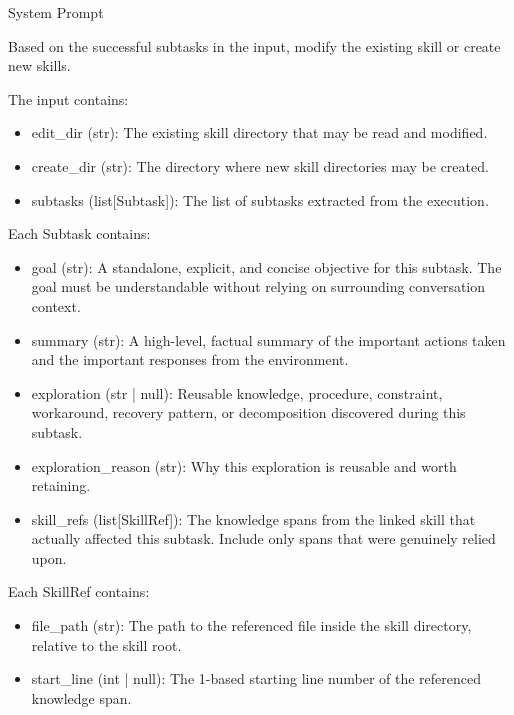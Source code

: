 \documentclass{llmxive}
\providecommand{\svpromptheading}[1]{\par\smallskip\noindent{\sffamily\bfseries#1}\par}
\providecommand{\svinlinecode}[1]{{\ttfamily #1}}
\begin{document}
\begin{svpromptbox}{System Prompt}

\svpromptheading{TODO}
\smallskip
Based on the successful subtasks in the input, modify the existing skill or create new skills.\par
\smallskip
\svpromptheading{Input}
\smallskip
The input contains:\par
\smallskip
\begin{itemize}
\item \svinlinecode{edit\_dir} (\svinlinecode{str}): The existing skill directory that may be read and modified.
\item \svinlinecode{create\_dir} (\svinlinecode{str}): The directory where new skill directories may be created.
\item \svinlinecode{subtasks} (\svinlinecode{list[Subtask]}): The list of subtasks extracted from the execution.
\end{itemize}
\smallskip
Each \svinlinecode{Subtask} contains:\par
\smallskip
\begin{itemize}
\item \svinlinecode{goal} (\svinlinecode{str}): A standalone, explicit, and concise objective for this subtask. The goal must be understandable without relying on surrounding conversation context.
\item \svinlinecode{summary} (\svinlinecode{str}): A high-level, factual summary of the important actions taken and the important responses from the environment.
\item \svinlinecode{exploration} (\svinlinecode{str | null}): Reusable knowledge, procedure, constraint, workaround, recovery pattern, or decomposition discovered during this subtask.
\item \svinlinecode{exploration\_reason} (\svinlinecode{str}): Why this exploration is reusable and worth retaining.
\item \svinlinecode{skill\_refs} (\svinlinecode{list[SkillRef]}): The knowledge spans from the linked skill that actually affected this subtask. Include only spans that were genuinely relied upon.
\end{itemize}
\smallskip
Each \svinlinecode{SkillRef} contains:\par
\smallskip
\begin{itemize}
\item \svinlinecode{file\_path} (\svinlinecode{str}): The path to the referenced file inside the skill directory, relative to the skill root.
\item \svinlinecode{start\_line} (\svinlinecode{int | null}): The 1-based starting line number of the referenced knowledge span.

\end{itemize}
\end{svpromptbox}
\end{document}
